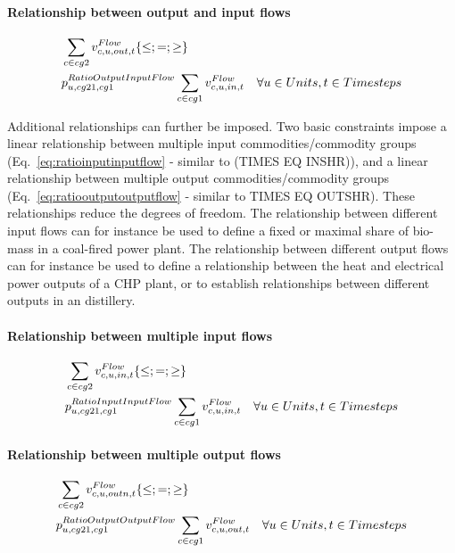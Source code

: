 \paragraph{Relationship between output and input flows}
\begin{align} \label{eq:ratiooutputinputflow}
&\sum_{\commodity \in cg2} \vFlow[\commodity,\unit,out,\timestep] \{\le;=;\ge\} \nonumber \\
&\pRatioOutputInputFlow \sum_{\commodity \in cg1} \vFlow[\commodity,\unit,in,\timestep] \quad \forall \units, \timesteps
\end{align}

Additional relationships can further be imposed. Two basic constraints impose a linear relationship between multiple input commodities/commodity groups (Eq.~\eqref{eq:ratioinputinputflow} - similar to (TIMES EQ INSHR)), and a linear relationship between multiple output commodities/commodity groups (Eq.~\eqref{eq:ratiooutputoutputflow} - similar to TIMES EQ OUTSHR). These relationships reduce the degrees of freedom. The relationship between different input flows can for instance be used to define a fixed or maximal share of bio-mass in a coal-fired power plant. The relationship between different output flows can for instance be used to define a relationship between the heat and electrical power outputs of a CHP plant, or to establish relationships between different outputs in an distillery.

\paragraph{Relationship between multiple input flows}
\begin{align} \label{eq:ratioinputinputflow}
&\sum_{\commodity \in cg2} \vFlow[\commodity,\unit,in,\timestep] \{\le;=;\ge\} \nonumber \\
&\pRatioInputInputFlow \sum_{\commodity \in cg1} \vFlow[\commodity,\unit,in,\timestep] \quad \forall \units, \timesteps
\end{align}

\paragraph{Relationship between multiple output flows}
\begin{align} \label{eq:ratiooutputoutputflow}
&\sum_{\commodity \in cg2} \vFlow[\commodity,\unit,outn,\timestep] \{\le;=;\ge\} \nonumber \\
&\pRatioOutputOutputFlow \sum_{\commodity \in cg1} \vFlow[\commodity,\unit,out,\timestep] \quad \forall \units, \timesteps
\end{align}

